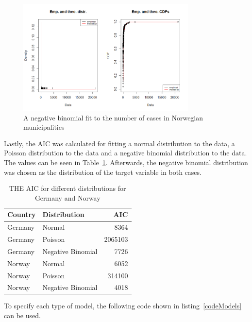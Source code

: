 %     
\begin{figure}[H]
    \centering
    \includegraphics[width = 0.8\textwidth]{neg_binom_norge.png}
    \caption{A negative binomial fit to the number of cases in Norwegian municipalities}
    \label{nb_norge}
\end{figure}
Lastly, the AIC was calculated for fitting a normal distribution to the data, a Poisson distribution to the data and a negative binomial distribution to the data. The values can be seen in Table~\ref{aic}. Afterwards, the negative binomial distribution was chosen as the distribution of the target variable in both cases. \\
\begin{table}[H] 
\caption{THE AIC for different distributions for Germany and Norway \label{aic}}
\begin{tabular}{l l r}
\toprule
\textbf{Country}	& \textbf{Distribution}	& \textbf{AIC} \\
\midrule
Germany & Normal & 8364 \\
Germany & Poisson & 2065103 \\
Germany & Negative Binomial & 7726 \\
Norway & Normal & 6052 \\
Norway & Poisson & 314100 \\
Norway & Negative Binomial & 4018 \\
\bottomrule
\end{tabular}
\end{table} 
To specify each type of model, the following code shown in listing~\ref{codeModels} can be used. \\
